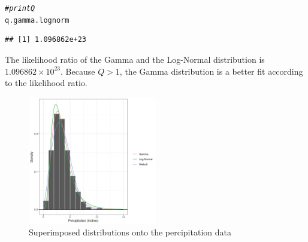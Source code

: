 \documentclass{article}\usepackage[]{graphicx}\usepackage[]{xcolor}
\makeatletter
\newcommand{\hlcom}[1]{\textcolor[rgb]{0.678,0.584,0.686}{\textit{#1}}}%
\newcommand{\hldef}[1]{\textcolor[rgb]{0.345,0.345,0.345}{#1}}%
\newenvironment{kframe}{%
 \def\at@end@of@kframe{}%
 \ifinner\ifhmode%
  \def\at@end@of@kframe{\end{minipage}}%
  \begin{minipage}{\columnwidth}%
 \fi\fi%
 \def\FrameCommand##1{\hskip\@totalleftmargin \hskip-\fboxsep
 \colorbox{shadecolor}{##1}\hskip-\fboxsep
     \hskip-\linewidth \hskip-\@totalleftmargin \hskip\columnwidth}%
 \MakeFramed {\advance\hsize-\width
   \@totalleftmargin\z@ \linewidth\hsize
   \@setminipage}}%
 {\par\unskip\endMakeFramed%
 \at@end@of@kframe}
\newenvironment{knitrout}{}{} %
\makeatother
\begin{document}
\begin{enumerate}
\begin{enumerate}
\begin{knitrout}
\begin{kframe}
\begin{alltt}
\hlcom{#print Q}
\hldef{q.gamma.lognorm}
\end{alltt}
\begin{verbatim}
## [1] 1.096862e+23
\end{verbatim}
\end{kframe}
\end{knitrout}
The likelihood ratio of the Gamma and the Log-Normal distribution is \ensuremath{1.096862\times 10^{23}}. Because $Q > 1$, the Gamma distribution is a better fit according to the likelihood ratio. 
  \end{enumerate}

\end{enumerate}

\begin{figure}
 \centering
 \includegraphics[width=0.5\textwidth]{histogram.png}
 \caption{Superimposed distributions onto the percipitation data}
 \label{fig:label}
\end{figure}


\end{document}
